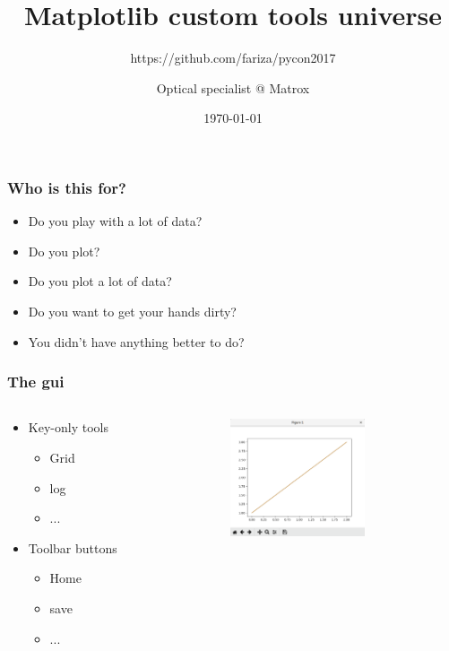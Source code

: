 \documentclass{beamer}
\title{Matplotlib custom tools universe}
\subtitle{https://github.com/fariza/pycon2017}
\author{Optical specialist @ Matrox}
\date{\today}
\begin{document}
\begin{frame}
  \titlepage
\end{frame}

\begin{frame}
  \frametitle{Who is this for?}
  \begin{itemize}
    \item Do you play with a lot of data?
    \item Do you plot?
    \item Do you plot a lot of data?
    \item Do you want to get your hands dirty?
    \item You didn't have anything better to do?
  \end{itemize}
\end{frame}

\begin{frame}
\frametitle{The gui}
\begin{columns}
\begin{column}{0.5\textwidth}
  \begin{itemize}
      \item Key-only tools
      \begin{itemize}
        \item Grid
        \item log
        \item ...
      \end{itemize}
      \item Toolbar buttons
      \begin{itemize}
        \item Home
        \item save
        \item ...
      \end{itemize}
  \end{itemize}
\end{column}
\begin{column}{0.5\textwidth}
  \begin{figure}
  \includegraphics[width=150px]{gui}
  \end{figure}
\end{column}
\end{columns}
\end{frame}
\end{document}
